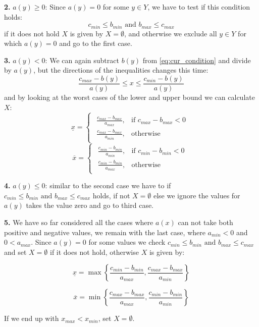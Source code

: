 \textbf{2.}
$a(y) \geq 0$:
Since $a(y) = 0$ for some $y\in Y$, we have to test if this condition holds:
\[
	c_{min} \leq b_{min} \text{ and } b_{max} \leq c_{max}
\]
if it does not hold $X$ is given by $X=\emptyset$, and otherwise we exclude all $y\in Y$ for which $a(y)=0$ and go to the first case.

\textbf{3.}
$a(y) < 0$:
We can again subtract $b(y)$ from \ref{eq:cur_condition} and divide by $a(y)$, but the directions of the inequalities changes this time:
\[
	\frac{c_{max}-b(y)}{a(y)} \leq x \leq \frac{c_{min}-b(y)}{a(y)}
\]
and by looking at the worst cases of the lower and upper bound we can calculate $X$:
\[
	\underline{x} =
	\begin{cases}
		\begin{array}{ll}
			\frac{c_{max}-b_{max}}{a_{max}}, & \text{if } c_{max}-b_{max} < 0 \\[10pt]
			\frac{c_{max}-b_{max}}{a_{min}}, & \text{otherwise}
		\end{array}
	\end{cases}
\]
\[
	\overline{x} =
	\begin{cases}
		\begin{array}{ll}
			\frac{c_{min}-b_{min}}{a_{min}}, & \text{if } c_{min}-b_{min} < 0 \\[10pt]
			\frac{c_{min}-b_{min}}{a_{max}}, & \text{otherwise}
		\end{array}
	\end{cases}
\]

\textbf{4.}
$a(y) \leq 0$:
similar to the second case we have to if $c_{min} \leq b_{min} \text{ and } b_{max} \leq c_{max}$ holds, if not $X=\emptyset$ else we ignore the values for $a(y)$ takes the value zero and go to third case.

\textbf{5.}
We have so far considered all the cases where $a(x)$ can not take both positive and negative values, we remain with the last case, where $a_{min}<0$
and $0<a_{max}$.
Since $a(y)=0$ for some values we check $c_{min} \leq b_{min} \text{ and } b_{max} \leq c_{max}$ and set $X=\emptyset$ if it does not hold, otherwise
$X$ is given by:

\[ \underline{x} = \max \left\{ \frac{c_{min} - b_{min}}{a_{max}}, \frac{c_{max} - b_{max}}{a_{min}} \right\} \]

\[ \overline{x} = \min \left\{ \frac{c_{max} - b_{max}}{a_{max}}, \frac{c_{min} - b_{min}}{a_{min}} \right\} \]

If we end up with $x_{max} < x_{min}$, set $X=\emptyset$.

